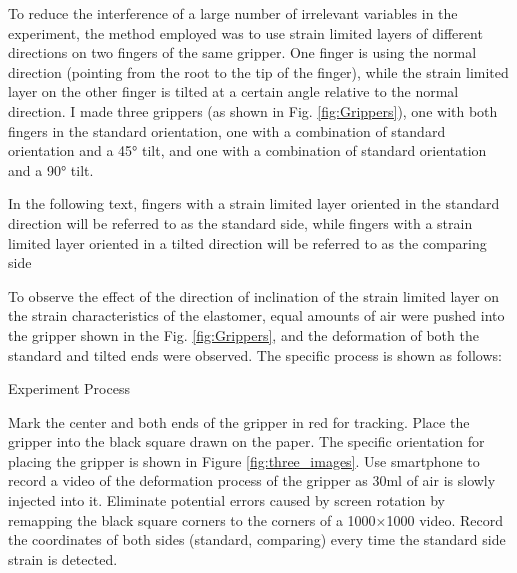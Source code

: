 \documentclass[conference]{IEEEtran}
\begin{document}
To reduce the interference of a large number of irrelevant variables in the experiment, the method employed was to use strain limited layers of different directions on two fingers of the same gripper. One finger is using the normal direction (pointing from the root to the tip of the finger), while the strain limited layer on the other finger is tilted at a certain angle relative to the normal direction. I made three grippers (as shown in Fig. \ref{fig:Grippers}), one with both fingers in the standard orientation, one with a combination of standard orientation and a 45° tilt, and one with a combination of standard orientation and a 90° tilt. 

In the following text, fingers with a strain limited layer oriented in the standard direction will be referred to as the standard side, while fingers with a strain limited layer oriented in a tilted direction will be referred to as the comparing side

To observe the effect of the direction of inclination of the strain limited layer on the strain characteristics of the elastomer, equal amounts of air were pushed into the gripper shown in the Fig. \ref{fig:Grippers}, and the deformation of both the standard and tilted ends were observed. The specific process is shown as follows:

\begin{algorithm}
	\caption{Experiment Process}\label{pseudo:ExperimentProcess}
	\begin{algorithmic}[1]
            \State Mark the center and both ends of the gripper in red for tracking.
            \State Place the gripper into the black square drawn on the paper. The specific orientation for placing the gripper is shown in Figure \ref{fig:three_images}.
            \State Use smartphone to record a video of the deformation process of the gripper as 30ml of air is slowly injected into it.
            \State Eliminate potential errors caused by screen rotation by remapping the black square corners to the corners of a 1000$\times$1000 video. 
            \State Record the coordinates of both sides (standard, comparing) every time the standard side strain is detected.
	\end{algorithmic} 
\end{algorithm}
\end{document}
